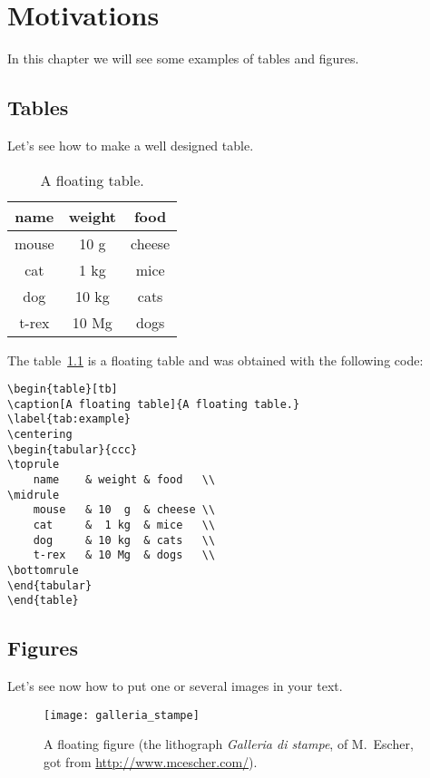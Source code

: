 \chapter{Motivations}
In this chapter we will see some examples of tables and figures.

\section{Tables}
Let's see how to make a well designed table.

\begin{table}[tb]
\caption[A floating table]{A floating table.}
\label{tab:esempio}
\centering
\begin{tabular}{ccc}
\toprule
name & weight & food \\ 
\midrule
mouse	& 10 g	& cheese \\
cat	& 1 kg	& mice \\
dog	& 10 kg	& cats \\
t-rex	& 10 Mg	& dogs \\
\bottomrule 
\end{tabular}
\end{table}

The table~\ref{tab:esempio} is a floating table and was obtained with the following code:
\begin{lstlisting}
\begin{table}[tb]
\caption[A floating table]{A floating table.}
\label{tab:example}
\centering
\begin{tabular}{ccc}
\toprule
	name 	& weight & food	  \\ 
\midrule
	mouse	& 10  g	 & cheese \\
	cat		&  1 kg	 & mice	  \\
	dog		& 10 kg	 & cats   \\
	t-rex	& 10 Mg	 & dogs	  \\
\bottomrule 
\end{tabular}
\end{table}
\end{lstlisting}

\lipsum[1-2]


\section{Figures}
Let's see now how to put one or several images in your text.


\begin{figure}[tb] 
\centering 
\texttt{[image: galleria\_stampe]} 
\caption[A floating figure]{A floating figure (the lithograph \emph{Galleria di stampe}, of M.~Escher, got from \url{http://www.mcescher.com/}).}
\label{fig:galleria} 
\end{figure}

